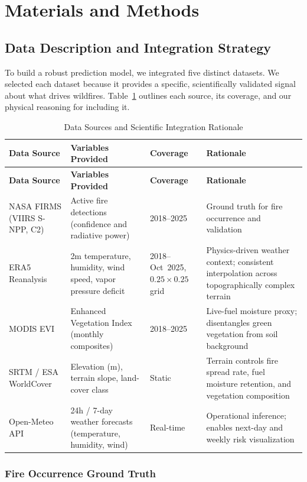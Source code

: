 \section{Materials and Methods}

\subsection{Data Description and Integration Strategy}

To build a robust prediction model, we integrated five distinct datasets. We selected each dataset because it provides a specific, scientifically validated signal about what drives wildfires. Table~\ref{tab:data_sources} outlines each source, its coverage, and our physical reasoning for including it.

\begin{longtable}{|p{2.8cm}|p{3.6cm}|p{1.8cm}|p{3.9cm}|}
\caption{Data Sources and Scientific Integration Rationale}
\label{tab:data_sources}\\
\hline
\textbf{Data Source} & \textbf{Variables Provided} & \textbf{Coverage} & \textbf{Rationale} \\
\hline
\endfirsthead
\hline
\textbf{Data Source} & \textbf{Variables Provided} & \textbf{Coverage} & \textbf{Rationale} \\
\hline
\endhead
NASA FIRMS (VIIRS S-NPP, C2) & Active fire detections (confidence and radiative power) & 2018--2025 & Ground truth for fire occurrence and validation \\
\hline
ERA5 Reanalysis & 2m temperature, humidity, wind speed, vapor pressure deficit & 2018--Oct~2025, $0.25 \times 0.25$ grid & Physics-driven weather context; consistent interpolation across topographically complex terrain \\
\hline
MODIS EVI & Enhanced Vegetation Index (monthly composites) & 2018--2025 & Live-fuel moisture proxy; disentangles green vegetation from soil background \\
\hline
SRTM / ESA WorldCover & Elevation (m), terrain slope, land-cover class & Static & Terrain controls fire spread rate, fuel moisture retention, and vegetation composition \\
\hline
Open-Meteo API & 24h / 7-day weather forecasts (temperature, humidity, wind) & Real-time & Operational inference; enables next-day and weekly risk visualization \\
\hline
\end{longtable}

\noindent
\subsubsection{Fire Occurrence Ground Truth}

